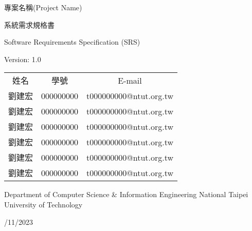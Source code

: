 \documentclass[a4paper, 12pt]{article}
\def\myProjectName{專案名稱(Project Name)}
\def\myVersion{1.0}
\newcommand\TwentyTitle{\fontsize{20pt}{24pt}\selectfont}
\newcommand\EighteenTitle{\fontsize{18pt}{20pt}\selectfont}
\newcommand\SixteenTitle{\fontsize{16pt}{18pt}\selectfont}
\begin{document}
\thispagestyle{empty}
\begin{center}
    {\TwentyTitle \myProjectName \par}
    \vspace{6cm}
    {\TwentyTitle 系統需求規格書 \par}
    {\EighteenTitle Software Requirements Specification (SRS) \par}
    {\SixteenTitle Version: \myVersion \par}
    \vspace{4cm}
    {\SixteenTitle
    \renewcommand{\arraystretch}{1.3} %
    \begin{tabular}{ccc}
      姓名 & 學號 & E-mail \\[0.2em]
      劉建宏 & 000000000 & t000000000@ntut.org.tw \\
      劉建宏 & 000000000 & t000000000@ntut.org.tw \\
      劉建宏 & 000000000 & t000000000@ntut.org.tw \\
      劉建宏 & 000000000 & t000000000@ntut.org.tw \\
      劉建宏 & 000000000 & t000000000@ntut.org.tw \\
      劉建宏 & 000000000 & t000000000@ntut.org.tw \\
    \end{tabular}
    \renewcommand{\arraystretch}{1} %
    \par}
    \vspace{2cm}
    {\SixteenTitle Department of Computer Science \& Information Engineering National Taipei University of Technology \par}
    \vspace{16pt}
    {\SixteenTitle 10/11/2023 \par}
\end{center}
\clearpage

\renewcommand{\contentsname}{目錄 (Table of Contents)}
\tableofcontents
\newpage



\end{document}
